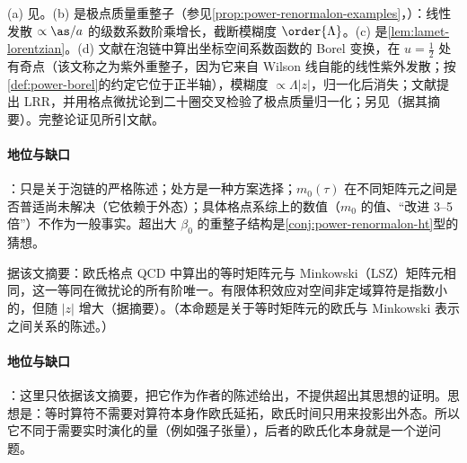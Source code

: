 \begin{proofsketch}
(a) 见\cite{Ji:2020brr}。(b) 是极点质量重整子\cite{Beneke:1994sw,Bigi:1994em}（参见\cref{prop:power-renormalon-examples}，\tagP）：线性发散 $\propto\as/a$ 的级数系数阶乘增长，截断模糊度 $\order{\Lambda}$。(c) 是\cref{lem:lamet-lorentzian}。(d) 文献\cite{Braun:2018brg}在泡链中算出坐标空间系数函数的 Borel 变换，在 $u=\frac12$ 处有奇点（该文称之为紫外重整子，因为它来自 Wilson 线自能的线性紫外发散；按\cref{def:power-borel}的约定它位于正半轴），模糊度 $\propto\Lambda|z|$，归一化后消失；文献\cite{Zhang:2023bxs}提出 LRR，并用格点微扰论到二十圈交叉检验了极点质量归一化；另见\cite{Holligan:2023rex}（据其摘要）。完整论证见所引文献。
\end{proofsketch}

\paragraph{地位与缺口}
\tagP：只是关于泡链的严格陈述；处方是一种方案选择；$m_0(\tau)$ 在不同矩阵元之间是否普适尚未解决（它依赖于外态\cite{Zhang:2023bxs}）；具体格点系综上的数值（$m_0$ 的值、“改进 3--5 倍”）不作为一般事实。超出大 $\beta_0$ 的重整子结构是\cref{conj:power-renormalon-ht}型的猜想。

\begin{proposition}\label{prop:lamet-euclid-minkowski}
据该文摘要\cite{Briceno:2017cpo}：欧氏格点 QCD 中算出的等时矩阵元与 Minkowski（LSZ）矩阵元相同，这一等同在微扰论的所有阶唯一。有限体积效应对空间非定域算符是指数小的，但随 $|z|$ 增大（据\cite{Briceno:2018lfj}摘要）。（本命题是关于等时矩阵元的欧氏与 Minkowski 表示之间关系的陈述。）
\end{proposition}

\paragraph{地位与缺口}
\tagA：这里只依据该文摘要，把它作为作者的陈述给出，不提供超出其思想的证明。思想是：等时算符不需要对算符本身作欧氏延拓，欧氏时间只用来投影出外态。所以它不同于需要实时演化的量（例如强子张量），后者的欧氏化本身就是一个逆问题。

